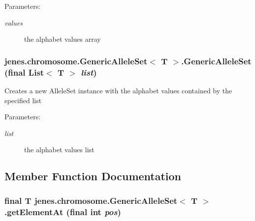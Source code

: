 \begin{Desc}
\item[Parameters:]
\begin{description}
\item[{\em values}]the alphabet values array \end{description}
\end{Desc}
\hypertarget{classjenes_1_1chromosome_1_1_generic_allele_set_3_01_t_01_4_8cbf2394287ce6321fcd338dc4c44a8e}{
\subsubsection[GenericAlleleSet]{\setlength{\rightskip}{0pt plus 5cm}jenes.chromosome.GenericAlleleSet$<$ T $>$.GenericAlleleSet (final List$<$ T $>$ {\em list})}}
\label{classjenes_1_1chromosome_1_1_generic_allele_set_3_01_t_01_4_8cbf2394287ce6321fcd338dc4c44a8e}


Creates a new AlleleSet instance with the alphabet values contained by the specified list 

\begin{Desc}
\item[Parameters:]
\begin{description}
\item[{\em list}]the alphabet values list \end{description}
\end{Desc}


\subsection{Member Function Documentation}
\hypertarget{classjenes_1_1chromosome_1_1_generic_allele_set_3_01_t_01_4_cf8f796e2243cc0b745b8d21e45ac7df}{
\subsubsection[getElementAt]{\setlength{\rightskip}{0pt plus 5cm}final T jenes.chromosome.GenericAlleleSet$<$ T $>$.getElementAt (final int {\em pos})}}
\label{classjenes_1_1chromosome_1_1_generic_allele_set_3_01_t_01_4_cf8f796e2243cc0b745b8d21e45ac7df}


